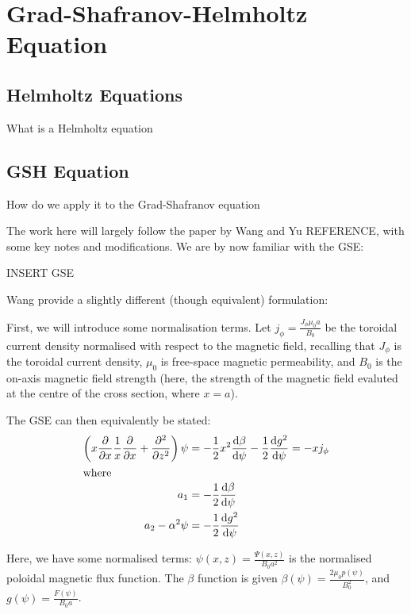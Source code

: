 \todo

\section{Grad-Shafranov-Helmholtz Equation}

\subsection{Helmholtz Equations}

What is a Helmholtz equation 

\subsection{GSH Equation}
How do we apply it to the Grad-Shafranov equation

The work here will largely follow the paper by Wang and Yu REFERENCE,
with some key notes and modifications. We are by now familiar with the 
GSE:

INSERT GSE

Wang provide a slightly different (though equivalent) formulation:
\begin{proposition}
    First, we will introduce some normalisation terms. Let $j_\phi = \frac{J_{\phi} \mu_0 a}{B_0}$ be 
    the toroidal current density normalised with respect to the magnetic field, recalling that $J_{\phi}$ 
    is the toroidal current density, $\mu_0$ is free-space magnetic permeability, 
    and $B_0$ is the on-axis magnetic field strength (here, the strength of the 
    magnetic field evaluted at the centre of the cross section, where $x = a$).

    The GSE can then equivalently be stated:
    \begin{align}
        \left ( x \pdv{x} \frac{1}{x} \pdv{x} + \pdv[2]{z} \right ) \psi &= -\frac{1}{2} x^2 \dv{\beta}{\psi} - \frac{1}{2}\dv{g^2}{\psi} = -x j_{\phi} \\
        \intertext{where}
        a_1 &= -\frac{1}{2} \dv{\beta}{\psi} \\
        a_2 - \alpha^2 \psi &= -\frac{1}{2} \dv{g^2}{\psi}
    \end{align}

    Here, we have some normalised terms: $\psi(x,z) = \frac{\Psi(x,z)}{B_0 a^2}$ is the normalised poloidal magnetic flux function. The $\beta$ 
    function is given $\beta(\psi) = \frac{2 \mu_0 p(\psi)}{B_0^2}$, and $g(\psi) = \frac{F(\psi)}{B_0 a}$. 
\end{proposition} 

